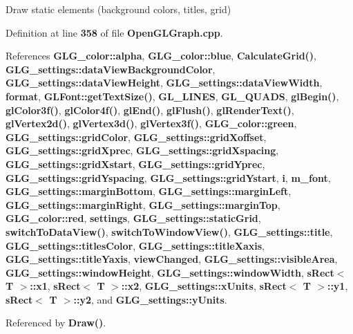 Draw static elements (background colors, titles, grid) 



Definition at line {\bf 358} of file {\bf Open\+G\+L\+Graph.\+cpp}.



References {\bf G\+L\+G\+\_\+color\+::alpha}, {\bf G\+L\+G\+\_\+color\+::blue}, {\bf Calculate\+Grid()}, {\bf G\+L\+G\+\_\+settings\+::data\+View\+Background\+Color}, {\bf G\+L\+G\+\_\+settings\+::data\+View\+Height}, {\bf G\+L\+G\+\_\+settings\+::data\+View\+Width}, {\bf format}, {\bf G\+L\+Font\+::get\+Text\+Size()}, {\bf G\+L\+\_\+\+L\+I\+N\+ES}, {\bf G\+L\+\_\+\+Q\+U\+A\+DS}, {\bf gl\+Begin()}, {\bf gl\+Color3f()}, {\bf gl\+Color4f()}, {\bf gl\+End()}, {\bf gl\+Flush()}, {\bf gl\+Render\+Text()}, {\bf gl\+Vertex2d()}, {\bf gl\+Vertex3d()}, {\bf gl\+Vertex3f()}, {\bf G\+L\+G\+\_\+color\+::green}, {\bf G\+L\+G\+\_\+settings\+::grid\+Color}, {\bf G\+L\+G\+\_\+settings\+::grid\+Xoffset}, {\bf G\+L\+G\+\_\+settings\+::grid\+Xprec}, {\bf G\+L\+G\+\_\+settings\+::grid\+Xspacing}, {\bf G\+L\+G\+\_\+settings\+::grid\+Xstart}, {\bf G\+L\+G\+\_\+settings\+::grid\+Yprec}, {\bf G\+L\+G\+\_\+settings\+::grid\+Yspacing}, {\bf G\+L\+G\+\_\+settings\+::grid\+Ystart}, {\bf i}, {\bf m\+\_\+font}, {\bf G\+L\+G\+\_\+settings\+::margin\+Bottom}, {\bf G\+L\+G\+\_\+settings\+::margin\+Left}, {\bf G\+L\+G\+\_\+settings\+::margin\+Right}, {\bf G\+L\+G\+\_\+settings\+::margin\+Top}, {\bf G\+L\+G\+\_\+color\+::red}, {\bf settings}, {\bf G\+L\+G\+\_\+settings\+::static\+Grid}, {\bf switch\+To\+Data\+View()}, {\bf switch\+To\+Window\+View()}, {\bf G\+L\+G\+\_\+settings\+::title}, {\bf G\+L\+G\+\_\+settings\+::titles\+Color}, {\bf G\+L\+G\+\_\+settings\+::title\+Xaxis}, {\bf G\+L\+G\+\_\+settings\+::title\+Yaxis}, {\bf view\+Changed}, {\bf G\+L\+G\+\_\+settings\+::visible\+Area}, {\bf G\+L\+G\+\_\+settings\+::window\+Height}, {\bf G\+L\+G\+\_\+settings\+::window\+Width}, {\bf s\+Rect$<$ T $>$\+::x1}, {\bf s\+Rect$<$ T $>$\+::x2}, {\bf G\+L\+G\+\_\+settings\+::x\+Units}, {\bf s\+Rect$<$ T $>$\+::y1}, {\bf s\+Rect$<$ T $>$\+::y2}, and {\bf G\+L\+G\+\_\+settings\+::y\+Units}.



Referenced by {\bf Draw()}.



